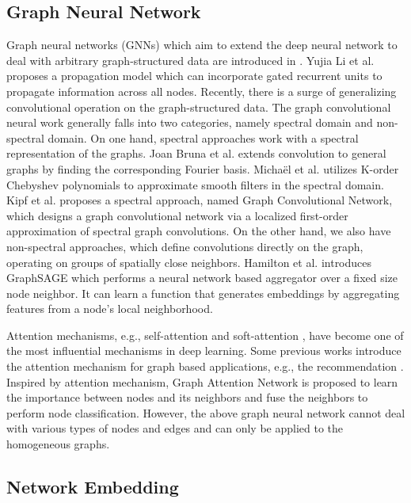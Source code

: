 \subsection{Graph Neural Network}
Graph neural networks (GNNs) which aim to extend the deep neural network to deal with arbitrary graph-structured data are introduced in \cite{gnn05,gnn09}. Yujia Li et al. \cite{ggnn} proposes a propagation model which can incorporate gated recurrent units to propagate information across all nodes. Recently, there is a surge of generalizing convolutional operation on the graph-structured data. The graph convolutional neural work generally falls into two categories, namely spectral domain and non-spectral domain. On one hand, spectral approaches work with a spectral representation of the graphs. Joan Bruna et al. \cite{gft14iclr} extends convolution to general graphs by finding the corresponding Fourier basis. 
Micha{\"e}l et al. \cite{16chebyshev} utilizes
K-order Chebyshev polynomials to approximate smooth filters in the spectral domain. Kipf et al. \cite{gcn} proposes a spectral approach, named Graph Convolutional Network,
which designs a graph
convolutional network via a localized first-order approximation of spectral graph convolutions. 
On the other hand, we also have non-spectral approaches, which define convolutions directly on the graph, operating on groups of spatially close neighbors. Hamilton et al. \cite{graphsage} introduces GraphSAGE which 
performs a neural network based aggregator over a fixed size node neighbor. It can learn a function that generates embeddings by aggregating features from a node’s local neighborhood.








Attention mechanisms, e.g.,
self-attention  \cite{attisallyouneed} and soft-attention \cite{bahdanau2014neural}, 
have become one of the most influential mechanisms in deep learning. Some previous works introduce the attention mechanism for graph based applications, e.g., the recommendation \cite{mcrec,han2018aspect}. 
Inspired by attention mechanism, 
Graph Attention Network \cite{gat} is proposed to learn the importance between nodes and its neighbors and fuse the neighbors to 
perform node classification. 
However, the above graph neural network cannot deal with various types of nodes and edges and can only be applied to the homogeneous graphs. 



\subsection{Network Embedding}


